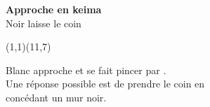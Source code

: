 \documentclass[preview, border=0pt, varwidth=false]{standalone}
\begin{document}
	\setgounit{0.6cm} 
	
\parbox[c][14.65cm][c]{10.2cm}{
	\centering
	
	{\Large\textbf{Approche en keima} \\ Noir laisse le coin}
	\vspace{3em}
	
	\begin{psgopartialboard}{(1,1)(11,7)}
		\pass
	\end{psgopartialboard}
	
	\vspace{1em}
	Blanc approche et se fait pincer par . \\ Une réponse possible est de prendre le coin en \\ concédant un mur noir.
}
\end{document}
